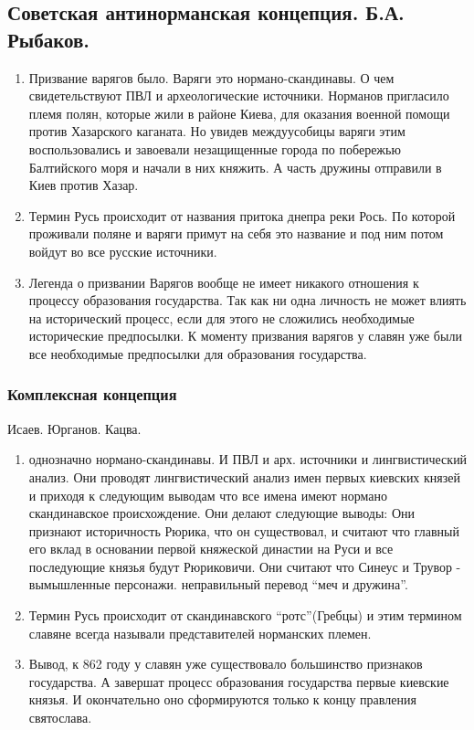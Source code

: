 \documentclass[a4paper]{article}
\begin{document}
\subsection{Советская антинорманская концепция. Б.А. Рыбаков.}
\begin{enumerate}
    \item Призвание варягов было. Варяги это нормано-скандинавы. О чем свидетельствуют ПВЛ и археологические источники. Норманов пригласило племя полян, которые жили в районе Киева, для оказания военной помощи против Хазарского каганата. Но увидев междуусобицы варяги этим воспользовались и завоевали незащищенные города по побережью Балтийского моря и начали в них княжить. А часть дружины отправили в Киев против Хазар.
    \item Термин Русь происходит от названия притока днепра реки Рось.
    По которой проживали поляне и варяги примут на себя это название и под ним потом войдут во все русские источники.
    \item Легенда о призвании Варягов вообще не имеет никакого отношения к процессу образования государства. Так как ни одна личность не может влиять на исторический процесс, если для этого не сложились необходимые исторические предпосылки. К моменту призвания варягов у славян уже были все необходимые предпосылки для образования государства.
\end{enumerate}

\subsubsection{Комплексная концепция}
Исаев. Юрганов. Кацва. 
\begin{enumerate}
    \item однозначно нормано-скандинавы. И ПВЛ и арх. источники и лингвистический анализ. Они проводят лингвистический анализ имен первых киевских князей и приходя к следующим выводам что все имена имеют нормано скандинавское происхождение. Они делают следующие выводы:
    Они признают историчность Рюрика, что он существовал, и считают что главный его вклад в основании первой княжеской династии на Руси и все последующие князья будут Рюриковичи. Они считают что Синеус и Трувор - вымышленные персонажи. неправильный перевод ``меч и дружина''.
    \item
    Термин Русь происходит от скандинавского ``ротс''(Гребцы) и этим термином славяне всегда называли представителей норманских племен.
    \item Вывод, к 862 году у славян уже существовало большинство признаков государства. А завершат процесс образования государства первые киевские князья. И окончательно оно сформируются только к концу правления святослава.
\end{enumerate}
\end{document}
